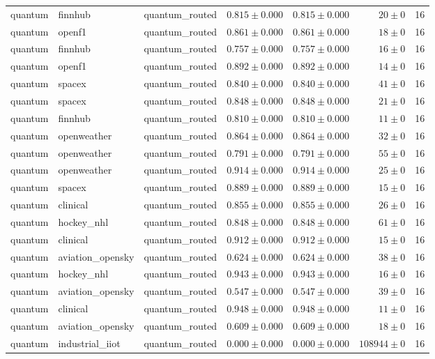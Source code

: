 \begin{table}[htbp]
\begin{tabular}{l l l r r r r}
quantum & finnhub & quantum\_routed & $0.815\pm0.000$ & $0.815\pm0.000$ & $20\pm0$ & 16 \\
quantum & openf1 & quantum\_routed & $0.861\pm0.000$ & $0.861\pm0.000$ & $18\pm0$ & 16 \\
quantum & finnhub & quantum\_routed & $0.757\pm0.000$ & $0.757\pm0.000$ & $16\pm0$ & 16 \\
quantum & openf1 & quantum\_routed & $0.892\pm0.000$ & $0.892\pm0.000$ & $14\pm0$ & 16 \\
quantum & spacex & quantum\_routed & $0.840\pm0.000$ & $0.840\pm0.000$ & $41\pm0$ & 16 \\
quantum & spacex & quantum\_routed & $0.848\pm0.000$ & $0.848\pm0.000$ & $21\pm0$ & 16 \\
quantum & finnhub & quantum\_routed & $0.810\pm0.000$ & $0.810\pm0.000$ & $11\pm0$ & 16 \\
quantum & openweather & quantum\_routed & $0.864\pm0.000$ & $0.864\pm0.000$ & $32\pm0$ & 16 \\
quantum & openweather & quantum\_routed & $0.791\pm0.000$ & $0.791\pm0.000$ & $55\pm0$ & 16 \\
quantum & openweather & quantum\_routed & $0.914\pm0.000$ & $0.914\pm0.000$ & $25\pm0$ & 16 \\
quantum & spacex & quantum\_routed & $0.889\pm0.000$ & $0.889\pm0.000$ & $15\pm0$ & 16 \\
quantum & clinical & quantum\_routed & $0.855\pm0.000$ & $0.855\pm0.000$ & $26\pm0$ & 16 \\
quantum & hockey\_nhl & quantum\_routed & $0.848\pm0.000$ & $0.848\pm0.000$ & $61\pm0$ & 16 \\
quantum & clinical & quantum\_routed & $0.912\pm0.000$ & $0.912\pm0.000$ & $15\pm0$ & 16 \\
quantum & aviation\_opensky & quantum\_routed & $0.624\pm0.000$ & $0.624\pm0.000$ & $38\pm0$ & 16 \\
quantum & hockey\_nhl & quantum\_routed & $0.943\pm0.000$ & $0.943\pm0.000$ & $16\pm0$ & 16 \\
quantum & aviation\_opensky & quantum\_routed & $0.547\pm0.000$ & $0.547\pm0.000$ & $39\pm0$ & 16 \\
quantum & clinical & quantum\_routed & $0.948\pm0.000$ & $0.948\pm0.000$ & $11\pm0$ & 16 \\
quantum & aviation\_opensky & quantum\_routed & $0.609\pm0.000$ & $0.609\pm0.000$ & $18\pm0$ & 16 \\
quantum & industrial\_iiot & quantum\_routed & $0.000\pm0.000$ & $0.000\pm0.000$ & $108944\pm0$ & 16 \\

\end{tabular}
\end{table}
